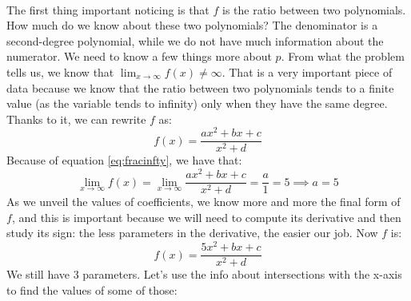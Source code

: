 \paragraph{}
The first thing important noticing is that $f$ is the ratio between two
polynomials. How much do we know about these two polynomials? The
denominator is a second-degree polynomial, while we do not have much
information about the numerator. We need to know a few things more about
$p$. From what the problem tells us, we know that
$\lim_{x \to \infty} f(x) \neq \infty$. That is a very important piece
of data because we know that the ratio between two polynomials tends
to a finite value (as the variable tends to infinity) only when they
have the same
degree.
Thanks to it, we can rewrite $f$ as:
\begin{equation}\label{eq:fracinfty}
    f(x) = \frac{ax^2 + bx + c}{x^2 + d}
\end{equation}
Because of equation \ref{eq:fracinfty}, we have that:
\begin{equation*}
    \lim_{x \to \infty} f(x) = \lim_{x \to \infty} \frac{ax^2 + bx + c}{x^2 + d}
        = \frac{a}{1} = 5
        \implies a = 5
\end{equation*}
As we unveil the values of coefficients, we know more and more the final form
of $f$, and this is important because we will need to compute its derivative and
then study its sign: the less parameters in the derivative, the easier our job.
Now $f$ is:
\begin{equation*}
    f(x) = \frac{5x^2 + bx + c}{x^2 + d}
\end{equation*}
We still have 3 parameters.
Let's use the info about intersections with the x-axis to find the values of some
of those:
